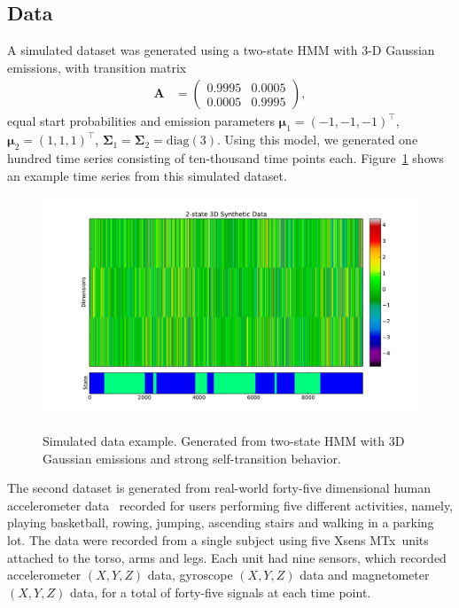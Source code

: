 \documentclass[12pt]{article}
\begin{document}
\subsection{Data}\label{sec:datasets}

A simulated dataset was generated using a two-state HMM with 3-D Gaussian emissions, with transition matrix
\begin{align*}
    \mathbf{A} &= \left( 
                   \begin{array}{ccc}
                    0.9995 & 0.0005 \\
                    0.0005 & 0.9995
                   \end{array}
                   \right),
\end{align*}
equal start probabilities and emission parameters $\mathbf{\mu}_1 = (-1, -1, -1)^\top$, $\mathbf{\mu}_2 = (1, 1, 1)^\top$, $\mathbf{\Sigma}_1 = \mathbf{\Sigma}_2 = \text{diag}(3)$. Using this model, we generated one hundred time series consisting of ten-thousand time points each. Figure~\ref{fig:simulated} shows an example time series from this simulated dataset.

\begin{figure}[htbp]
  \caption{Simulated data example. Generated from two-state HMM with 3D Gaussian emissions and strong self-transition behavior.}
  \centering
    \includegraphics[width=1.\linewidth]{images/3D_synthetic_data_example.pdf}
    \label{fig:simulated}
\end{figure}
The second dataset is generated from real-world forty-five dimensional human accelerometer data~\cite{Altun:2010:CSC:1823245.1823314} recorded for users performing five different activities, namely, playing basketball, rowing, jumping, ascending stairs and walking in a parking lot. The data were recorded from a single subject using five Xsens MTx\texttrademark\ units attached to the torso, arms and legs. Each unit had nine sensors, which recorded accelerometer $(X, Y, Z)$ data, gyroscope $(X,Y,Z)$ data and magnetometer $(X,Y,Z)$ data, for a total of forty-five signals at each time point.
\end{document}
